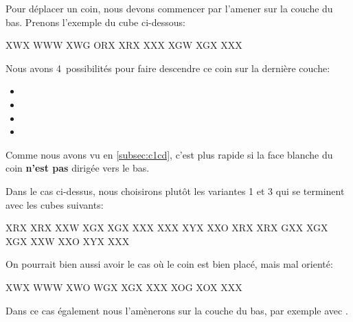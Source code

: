 Pour déplacer un coin, nous devons commencer par l'amener sur la couche du bas. Prenons l'exemple du cube ci-dessous:

\begin{center}
	\RubikFaceUp%
	{X}{W}{X}%
	{W}{W}{W}%
	{X}{W}{G}
	\RubikFaceRight%
	{O}{R}{X}%
	{X}{R}{X}%
	{X}{X}{X}
	\RubikFaceFront%
	{X}{G}{W}%
	{X}{G}{X}%
	{X}{X}{X}
\end{center}

Nous avons 4~possibilités pour faire descendre ce coin sur la dernière couche:

\begin{itemize}
	\item {}
	\item {}
	\item {}
	\item {}		
\end{itemize}

Comme nous avons vu en \ref{subsec:c1cd}, c'est plus rapide si la face blanche du coin \textbf{n'est pas} dirigée vers le bas.

\begin{samepage}
Dans le cas ci-dessus, nous choisirons plutôt les variantes 1 et 3 qui se terminent avec les cubes suivants:

\begin{center}	
	\RubikFaceRight%
	{X}{R}{X}%
	{X}{R}{X}%
	{X}{X}{W}
	\RubikFaceFront%
	{X}{G}{X}%
	{X}{G}{X}%
	{X}{X}{X}
	\RubikFaceDown%
	{X}{X}{X}%
	{X}{Y}{X}%
	{X}{X}{O}
	\hspace*{1cm} 	
	\RubikFaceRight%
	{X}{R}{X}%
	{X}{R}{X}%
	{G}{X}{X}
	\RubikFaceFront%
	{X}{G}{X}%
	{X}{G}{X}%
	{X}{X}{W}
	\RubikFaceDown%
	{X}{X}{O}%
	{X}{Y}{X}%
	{X}{X}{X}
\end{center} 
\end{samepage}
	
On pourrait bien aussi avoir le cas où le coin est bien placé, mais mal orienté:

\begin{center}
	\RubikFaceUp%
	{X}{W}{X}%
	{W}{W}{W}%
	{X}{W}{O}
	\RubikFaceRight%
	{W}{G}{X}%
	{X}{G}{X}%
	{X}{X}{X}
	\RubikFaceFront%
	{X}{O}{G}%
	{X}{O}{X}%
	{X}{X}{X}
\end{center}

Dans ce cas également nous l'amènerons sur la couche du bas, par exemple avec .
 

